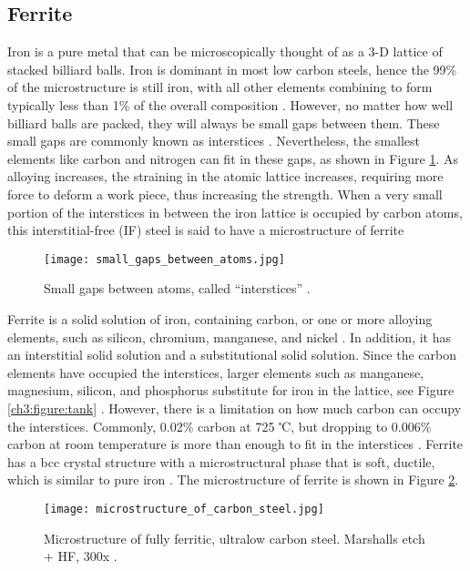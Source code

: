\subsection{Ferrite} 
Iron is a pure metal that can be microscopically thought of as a 3-D lattice of stacked billiard balls. Iron is dominant in most low carbon steels, hence the 99\% of the microstructure is still iron, with all other elements combining to form typically less than 1\% of the overall composition \cite{bajaj2020steels}. However, no matter how well billiard balls are packed, they will always be small gaps between them. These small gaps are commonly known as interstices \cite{bajaj2020steels}. Nevertheless, the smallest elements like carbon and nitrogen can fit in these gaps, as shown in Figure \ref{ch3:figure:gaps}. As alloying increases, the straining in the atomic lattice increases, requiring more force to deform a work piece, thus increasing the strength. When a very small portion of the interstices in between the iron lattice is occupied by carbon atoms, this interstitial-free (IF) steel is said to have a microstructure of ferrite \cite{bhadeshia2017steels}
 
\begin{figure}[H]
    \centering
    \texttt{[image: small\_gaps\_between\_atoms.jpg]}
    \caption{Small gaps between atoms, called “interstices” \cite{bajaj2020steels}.}
    \label{ch3:figure:gaps}
\end{figure}

Ferrite is a solid solution of iron, containing carbon, or one or more alloying elements, such as silicon, chromium, manganese, and nickel \cite{molabe2018determining}. In addition, it has an interstitial solid solution and a substitutional solid solution. Since the carbon elements have occupied the interstices, larger elements such as manganese, magnesium, silicon, and phosphorus substitute for iron in the lattice, see Figure \ref{ch3:figure:tank} \cite{jones2012engineering}. However, there is a limitation on how much carbon can occupy the interstices. Commonly, 0.02\% carbon at 725 ℃, but dropping to 0.006\% carbon at room temperature is more than enough to fit in the interstices \cite{bhadeshia2017steels}. Ferrite has a bcc crystal structure with a microstructural phase that is soft, ductile, which is similar to pure iron \cite{bajaj2020steels}. The microstructure of ferrite is shown in Figure \ref{ch3:figure:microstructure}.

\begin{figure}[H]
    \centering
    \texttt{[image: microstructure\_of\_carbon\_steel.jpg]}
    \caption{Microstructure of fully ferritic, ultralow carbon steel. Marshalls etch + HF, 300x \cite{molabe2018determining}.}
    \label{ch3:figure:microstructure}
\end{figure}

